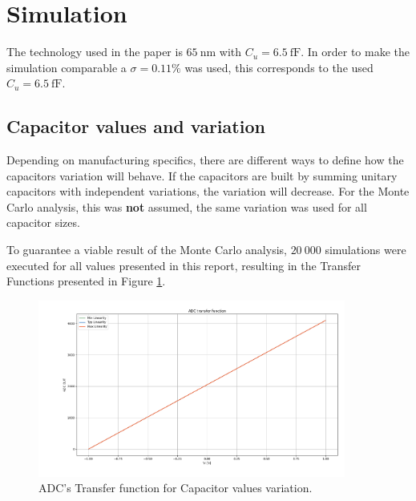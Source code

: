 \section{Simulation}
\label{sec:simulation}

The technology used in the paper is $\SI{65}{\nano\meter}$ with $C_u = \SI{6.5}{\femto\farad}$. In order to make the simulation comparable a $\sigma = 0.11\%$ was used, this corresponds to the used $C_u = \SI{6.5}{\femto\farad}$.


\subsection{Capacitor values and variation}

Depending on manufacturing specifics, there are different ways to define how the capacitors variation will behave. If the capacitors are built by summing unitary capacitors with independent variations, the variation will decrease. For the Monte Carlo analysis, this was \textbf{not} assumed, the same variation was used for all capacitor sizes.

To guarantee a viable result of the Monte Carlo analysis, $20~000$ simulations were executed for all values presented in this report, resulting in the Transfer Functions presented in Figure \ref{fig:ADC_TF_ALLCAPS}.

\begin{figure}[H]

    \centering
    \includegraphics*[width=0.9\textwidth]{Images/ADC_TransFunc_All_Caps_20Ksim_s0011.png}
    \caption{ADC's Transfer function for Capacitor values variation.}

    \label{fig:ADC_TF_ALLCAPS}
\end{figure}

